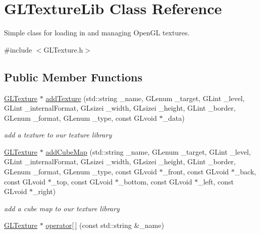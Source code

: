 \hypertarget{class_g_l_texture_lib}{\section{G\-L\-Texture\-Lib Class Reference}
\label{class_g_l_texture_lib}
}


Simple class for loading in and managing Open\-G\-L textures.  




{\ttfamily \#include $<$G\-L\-Texture.\-h$>$}

\subsection*{Public Member Functions}
\begin{DoxyCompactItemize}
\item 
\hyperlink{class_g_l_texture}{G\-L\-Texture} $\ast$ \hyperlink{class_g_l_texture_lib_a778cde3734906f46649defdda30d7d7e}{add\-Texture} (std\-::string \-\_\-name, G\-Lenum \-\_\-target, G\-Lint \-\_\-level, G\-Lint \-\_\-internal\-Format, G\-Lsizei \-\_\-width, G\-Lsizei \-\_\-height, G\-Lint \-\_\-border, G\-Lenum \-\_\-format, G\-Lenum \-\_\-type, const G\-Lvoid $\ast$\-\_\-data)
\begin{DoxyCompactList}\small\item\em add a texture to our texture library \end{DoxyCompactList}\item 
\hyperlink{class_g_l_texture}{G\-L\-Texture} $\ast$ \hyperlink{class_g_l_texture_lib_aece253fdd6aad02adca2d743c463a9f2}{add\-Cube\-Map} (std\-::string \-\_\-name, G\-Lenum \-\_\-target, G\-Lint \-\_\-level, G\-Lint \-\_\-internal\-Format, G\-Lsizei \-\_\-width, G\-Lsizei \-\_\-height, G\-Lint \-\_\-border, G\-Lenum \-\_\-format, G\-Lenum \-\_\-type, const G\-Lvoid $\ast$\-\_\-front, const G\-Lvoid $\ast$\-\_\-back, const G\-Lvoid $\ast$\-\_\-top, const G\-Lvoid $\ast$\-\_\-bottom, const G\-Lvoid $\ast$\-\_\-left, const G\-Lvoid $\ast$\-\_\-right)
\begin{DoxyCompactList}\small\item\em add a cube map to our texture library \end{DoxyCompactList}\item 
\hypertarget{class_g_l_texture_lib_aa18a039ee29d50ccd34a7e1f7d24ce5b}{\hyperlink{class_g_l_texture}{G\-L\-Texture} $\ast$ \hyperlink{class_g_l_texture_lib_aa18a039ee29d50ccd34a7e1f7d24ce5b}{operator\mbox{[}$\,$\mbox{]}} (const std\-::string \&\-\_\-name)}\label{class_g_l_texture_lib_aa18a039ee29d50ccd34a7e1f7d24ce5b}


\end{DoxyCompactItemize}
